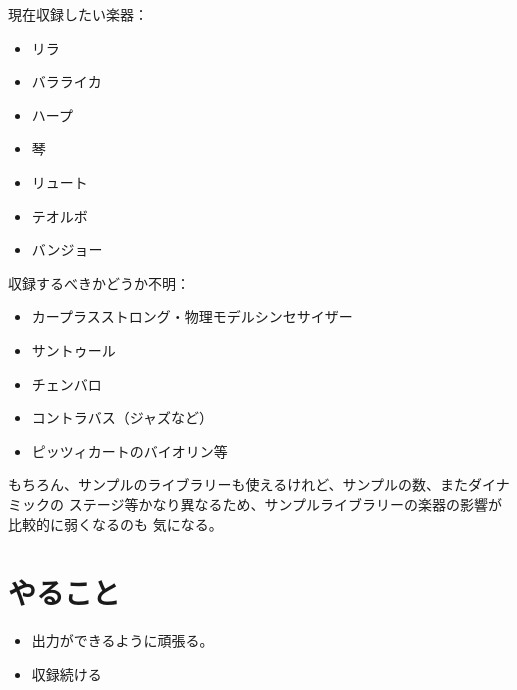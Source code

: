 \documentclass[a4paper, 12pt]{article}
\begin{document}
現在収録したい楽器：
\begin{itemize}
    \item リラ
    \item バラライカ
    \item ハープ
    \item 琴
    \item リュート
    \item テオルボ
    \item バンジョー\\
\end{itemize}

収録するべきかどうか不明：
\begin{itemize}
    \item カープラスストロング・物理モデルシンセサイザー
    \item サントゥール
    \item チェンバロ
    \item コントラバス（ジャズなど）
    \item ピッツィカートのバイオリン等\\
\end{itemize}
もちろん、サンプルのライブラリーも使えるけれど、サンプルの数、またダイナミックの
ステージ等かなり異なるため、サンプルライブラリーの楽器の影響が比較的に弱くなるのも
気になる。

\section*{やること}
\begin{itemize}
    \item 出力ができるように頑張る。
    \item 収録続ける
\end{itemize}



\end{document}
